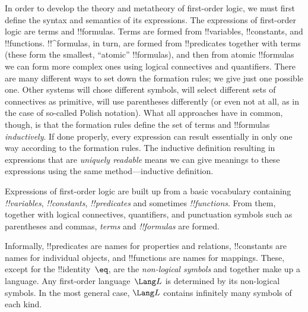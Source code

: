 




In order to develop the theory and metatheory of first-order logic, we
must first define the syntax and semantics of its expressions.  The
expressions of first-order logic are terms and !!{formula}s.  Terms
are formed from !!{variable}s, !!{constant}s, and !!{function}s.
!!^{formula}s, in turn, are formed from !!{predicate}s together with
terms (these form the smallest, ``atomic'' !!{formula}s), and then
from atomic !!{formula}s we can form more complex ones using logical
connectives and quantifiers.  There are many different ways to set
down the formation rules; we give just one possible one. Other systems
will chose different symbols, will select different sets of
connectives as primitive, will use parentheses differently (or even not
at all, as in the case of so-called Polish notation).  What all
approaches have in common, though, is that the formation rules define
the set of terms and !!{formula}s \emph{inductively}. If done
properly, every expression can result essentially in only one way
according to the formation rules.  The inductive definition resulting
in expressions that are \emph{uniquely readable} means we can give
meanings to these expressions using the same method---inductive
definition.








Expressions of first-order logic are built up from a basic vocabulary
containing \emph{!!{variable}s}, \emph{!!{constant}s},
\emph{!!{predicate}s} and sometimes \emph{!!{function}s}.  From them,
together with logical connectives, quantifiers, and punctuation
symbols such as parentheses and commas, \emph{terms} and
\emph{!!{formula}s} are formed.

\begin{explain}
Informally, !!{predicate}s are names for properties and relations,
!!{constant}s are names for individual objects, and !!{function}s are
names for mappings.  These, except for the !!{identity}~$\eq$, are the
\emph{non-logical symbols} and together make up a language.  Any
first-order language~$\Lang L$ is determined by its non-logical
symbols.  In the most general case, $\Lang L$ contains infinitely many
symbols of each kind.
\end{explain}

